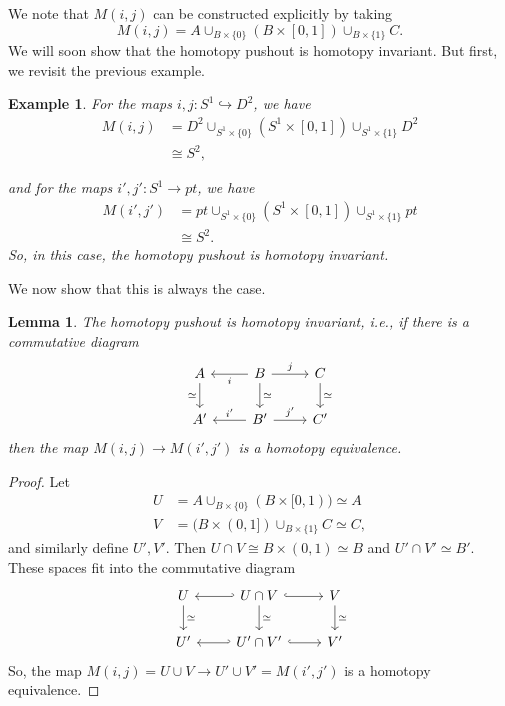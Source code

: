 \documentclass{article}
\newtheorem{lemma}[theorem]{Lemma}
\newtheorem{example}[theorem]{Example}
\newtheorem{proposed work}[theorem]{Proposed Work}
\begin{document}
We note that $M(i,j)$ can be constructed explicitly by taking
\begin{equation*}
M(i,j) = A \cup_{B \times \{0\}} (B \times [0,1]) \cup_{B \times \{1\}} C.
\end{equation*}
We will soon show that the homotopy pushout is homotopy invariant. But first, we revisit the previous example. 

\begin{example}
For the maps $i,j: S^1 \hookrightarrow D^2$, we have
\begin{align*}
M(i,j) &= D^2 \cup_{S^1 \times \{0\}} (S^1 \times [0,1]) \cup_{S^1 \times \{1\}} D^2 \\
&\cong S^2,
\end{align*}

and for the maps $i', j': S^1 \to pt$, we have
\begin{align*}
M(i',j') &= pt \cup_{S^1 \times \{0\}} (S^1 \times [0,1]) \cup_{S^1 \times \{1\}} pt \\
&\cong S^2.
\end{align*}
So, in this case, the homotopy pushout is homotopy invariant. 
\end{example}

We now show that this is always the case.

\begin{lemma}\label{hompoinvar}
The homotopy pushout is homotopy invariant, i.e., if there is a commutative diagram
\begin{equation*}
\begin{tikzcd}
A \arrow[d,swap, "\simeq"] & B \arrow[l, "i"] \arrow[r, "j"] \arrow[d, "\simeq"]& C \arrow[d, "\simeq"] \\
A' & B' \arrow[l,swap, "i'"] \arrow[r, "j'"] & C'
\end{tikzcd}
\end{equation*}
then the map $M(i,j) \to M(i',j')$ is a homotopy equivalence. 
\end{lemma}

\begin{proof}
Let 
\begin{align*}
U &= A \cup_{B \times \{0\}} (B \times [0,1)) \simeq A\\
V &= (B \times (0,1]) \cup_{B \times\{1\}} C \simeq C,
\end{align*}
and similarly define $U', V'$. Then $U \cap V \cong B \times (0,1) \simeq B$ and $U' \cap V' \simeq B'$. These spaces fit into the commutative diagram
\begin{equation*}
\begin{tikzcd}
U \arrow[d, "\simeq"] & U \cap V \arrow[l, hook'] \arrow[r, hook] \arrow[d, "\simeq"] & V \arrow[d, "\simeq"] \\
U' & U' \cap V' \arrow[l, hook'] \arrow[r,hook] & V'
\end{tikzcd}
\end{equation*}
So, the map $M(i,j) = U \cup V \to U' \cup V' = M(i',j')$ is a homotopy equivalence.
\end{proof}
\end{document}
